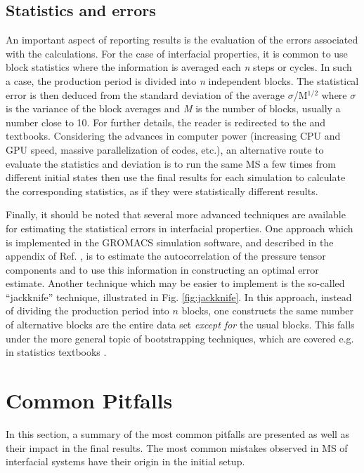 \documentclass[9pt,bestpractices]{livecoms}
\begin{document}
\subsection{Statistics and errors}

An important aspect of reporting results is the evaluation of the errors
associated with the calculations. For the case of interfacial properties, it is
common to use block statistics where the information is averaged each
\textit{n} steps or cycles. In such a case, the production period is divided
into \textit{n} independent blocks. The statistical error is then deduced from
the standard deviation of the average ${\sigma}$/M$^{\mathrm{1/2}}$ where
${\sigma}$ is the variance of the block averages and \textit{M} is the number
of blocks, usually a number close to 10. For further details, the reader is
redirected to the \citet{allen2017}
and \citet{frenkel2002}
textbooks. Considering the advances in computer power (increasing CPU and GPU speed,
massive parallelization of codes, etc.), an alternative route to evaluate the
statistics and deviation is to run the same MS a few times from different
initial states then use the final results for each simulation to calculate the
corresponding statistics, as if they were statistically different results.

Finally, it should be noted that several more advanced techniques are available
for estimating the statistical errors in interfacial properties. One approach
which is implemented in the GROMACS simulation software, and described in the
appendix of Ref. \citep{hess2002}, is to estimate the autocorrelation of the
pressure tensor components and to use this information in constructing an
optimal error estimate. Another technique which may be easier to implement is
the so-called ``jackknife'' technique, illustrated in Fig. \ref{fig:jackknife}.
In this approach, instead of dividing the production period into $n$ blocks,
one constructs the same number of alternative blocks are the entire data set
\emph{except for} the usual blocks.  This falls under the more general topic of
bootstrapping techniques, which are covered e.g. in statistics textbooks \citep{efron1982}.

\section{Common Pitfalls}

In this section, a summary of the most common pitfalls are presented as well as
their impact in the final results. The most common mistakes observed in MS of
interfacial systems have their origin in the initial setup. 
\end{document}
